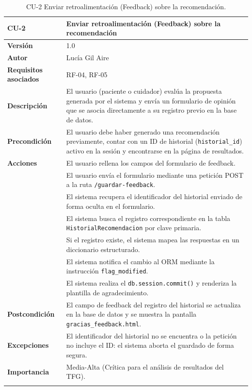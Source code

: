 \FloatBarrier

\begin{table}[!h]
	\centering
	\begin{tabular}{ l p{10cm} }
		\toprule
		\textbf{CU-2} & \textbf{Enviar retroalimentación (Feedback) sobre la recomendación}\\
		\midrule
		\addlinespace
		\textbf{Versión}  & 1.0 \\
		\addlinespace
		\textbf{Autor} & Lucía Gil Aire \\
		\addlinespace
		\textbf{Requisitos asociados} & RF-04, RF-05 \\
		\addlinespace
		\textbf{Descripción}  & El usuario (paciente o cuidador) evalúa la propuesta generada por el sistema y envía un formulario de opinión que se asocia directamente a su registro previo en la base de datos. \\
		\addlinespace
		\textbf{Precondición}   & El usuario debe haber generado una recomendación previamente, contar con un ID de historial (\texttt{historial\_id}) activo en la sesión y encontrarse en la página de resultados. \\
		\addlinespace
		\textbf{Acciones} & El usuario rellena los campos del formulario de feedback. \\
		& El usuario envía el formulario mediante una petición POST a la ruta \texttt{/guardar-feedback}. \\
		& El sistema recupera el identificador del historial enviado de forma oculta en el formulario. \\
		&  El sistema busca el registro correspondiente en la tabla \texttt{HistorialRecomendacion} por clave primaria. \\
		&  Si el registro existe, el sistema mapea las respuestas en un diccionario estructurado. \\
		&  El sistema notifica el cambio al ORM mediante la instrucción \texttt{flag\_modified}. \\
		&  El sistema realiza el \texttt{db.session.commit()} y renderiza la plantilla de agradecimiento. \\
		\addlinespace
		\textbf{Postcondición} & El campo de feedback del registro del historial se actualiza en la base de datos y se muestra la pantalla \texttt{gracias\_feedback.html}. \\
		\addlinespace
		\textbf{Excepciones} & El identificador del historial no se encuentra o la petición no incluye el ID: el sistema aborta el guardado de forma segura. \\
		\addlinespace
		\textbf{Importancia} & Media-Alta (Crítica para el análisis de resultados del TFG). \\
		\addlinespace
		\bottomrule
	\end{tabular}
	\caption{CU-2 Enviar retroalimentación (Feedback) sobre la recomendación.}
\end{table}
\FloatBarrier

